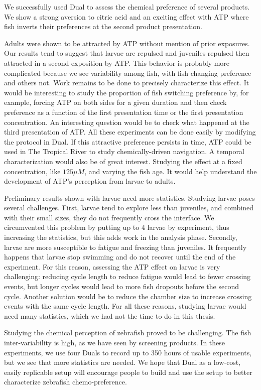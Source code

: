   We successfully used Dual to assess the chemical preference of several products. We show a strong aversion to citric acid and an exciting effect with ATP where fish inverts their preferences at the second product presentation.

  Adults were shown to be attracted by ATP without mention of prior exposures. Our results tend to suggest that larvae are repulsed and juveniles repulsed then attracted in a second exposition by ATP. This behavior is probably more complicated because we see variability among fish, with fish changing preference and others not. Work remains to be done to precisely characterize this effect. It would be interesting to study the proportion of fish switching preference by, for example, forcing ATP on both sides for a given duration and then check preference as a function of the first presentation time or the first presentation concentration. An interesting question would be to check what happened at the third presentation of ATP. All these experiments can be done easily by modifying the protocol in Dual. If this attractive preference persists in time, ATP could be used in The Tropical River to study chemically-driven navigation. A temporal characterization would also be of great interest. Studying the effect at a fixed concentration, like $125 \mu M$, and varying the fish age. It would help understand the development of ATP's perception from larvae to adults.

  Preliminary results shown with larvae need more statistics. Studying larvae poses several challenges. First, larvae tend to explore less than juveniles, and combined with their small sizes, they do not frequently cross the interface. We circumvented this problem by putting up to 4 larvae by experiment, thus increasing the statistics, but this adds work in the analysis phase. Secondly, larvae are more susceptible to fatigue and freezing than juveniles. It frequently happens that larvae stop swimming and do not recover until the end of the experiment.
For this reason, assessing the ATP effect on larvae is very challenging: reducing cycle length to reduce fatigue would lead to fewer crossing events, but longer cycles would lead to more fish dropouts before the second cycle. Another solution would be to reduce the chamber size to increase crossing events with the same cycle length. For all these reasons, studying larvae would need many statistics, which we had not the time to do in this thesis.

  Studying the chemical perception of zebrafish proved to be challenging. The fish inter-variability is high, as we have seen by screening products. In these experiments, we use four Duals to record up to 350 hours of usable experiments, but we see that more statistics are needed. We hope that Dual as a low-cost, easily replicable setup will encourage people to build and use the setup to better characterize zebrafish chemo-preference.


